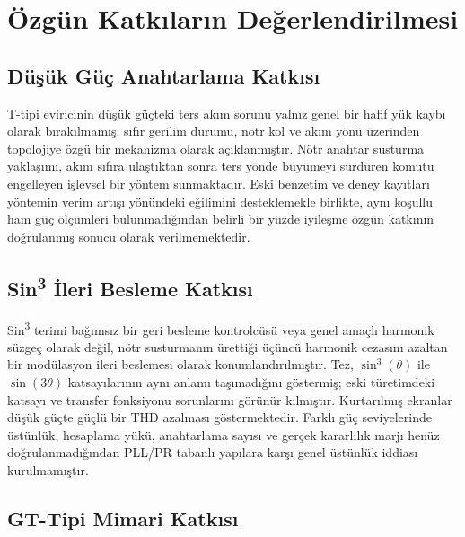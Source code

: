
\section{Özgün Katkıların Değerlendirilmesi}

\subsection{Düşük Güç Anahtarlama Katkısı}

T-tipi eviricinin düşük güçteki ters akım sorunu yalnız genel bir hafif yük kaybı olarak bırakılmamış; sıfır gerilim durumu, nötr kol ve akım yönü üzerinden topolojiye özgü bir mekanizma olarak açıklanmıştır. Nötr anahtar susturma yaklaşımı, akım sıfıra ulaştıktan sonra ters yönde büyümeyi sürdüren komutu engelleyen işlevsel bir yöntem sunmaktadır. Eski benzetim ve deney kayıtları yöntemin verim artışı yönündeki eğilimini desteklemekle birlikte, aynı koşullu ham güç ölçümleri bulunmadığından belirli bir yüzde iyileşme özgün katkının doğrulanmış sonucu olarak verilmemektedir.

\subsection{Sin\textsuperscript{3} İleri Besleme Katkısı}

Sin\textsuperscript{3} terimi bağımsız bir geri besleme kontrolcüsü veya genel amaçlı harmonik süzgeç olarak değil, nötr susturmanın ürettiği üçüncü harmonik cezasını azaltan bir modülasyon ileri beslemesi olarak konumlandırılmıştır. Tez, $\sin^3(\theta)$ ile $\sin(3\theta)$ katsayılarının aynı anlamı taşımadığını göstermiş; eski türetimdeki katsayı ve transfer fonksiyonu sorunlarını görünür kılmıştır. Kurtarılmış ekranlar düşük güçte güçlü bir THD azalması göstermektedir. Farklı güç seviyelerinde üstünlük, hesaplama yükü, anahtarlama sayısı ve gerçek kararlılık marjı henüz doğrulanmadığından PLL/PR tabanlı yapılara karşı genel üstünlük iddiası kurulmamıştır.

\subsection{GT-Tipi Mimari Katkısı}

